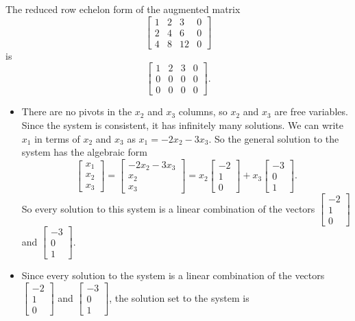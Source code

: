 \begin{example}
\item The reduced row echelon form of the augmented matrix
\[\left[ \begin{array}{ccc|c} 1&2&3&0 \\ 2&4&6&0 \\ 4&8&12&0 \end{array} \right]\]
is
\[\left[ \begin{array}{ccc|c} 1&2&3&0 \\ 0&0&0&0 \\ 0&0&0&0 \end{array} \right].\]
	\begin{itemize}
	\item There are no pivots in the $x_2$ and $x_3$ columns, so $x_2$ and $x_3$ are free variables. Since the system is consistent, it has infinitely many solutions. We can write $x_1$  in terms of  $x_2$ and $x_3$ as $x_1 = -2x_2-3x_3$. So the general solution to the system has the algebraic form
\[\left[ \begin{array}{c} x_1\\x_2\\x_3 \end{array} \right] = \left[ \begin{array}{c} -2x_2-3x_3\\x_2\\x_3 \end{array} \right] = x_2\left[ \begin{array}{r} -2\\1\\0 \end{array} \right] + x_3\left[ \begin{array}{r} -3\\0\\1 \end{array} \right].\]
So every solution to this system is a linear combination of the vectors $\left[ \begin{array}{r} -2\\1\\0 \end{array} \right] $ and $\left[ \begin{array}{r} -3\\0\\1 \end{array} \right]$.
	\item Since every solution to the system is a linear combination of the vectors $\left[ \begin{array}{r} -2\\1\\0 \end{array} \right]$ and $\left[ \begin{array}{r} -3\\0\\1 \end{array} \right]$, the solution set to the system is 

\end{itemize}
\end{example}
